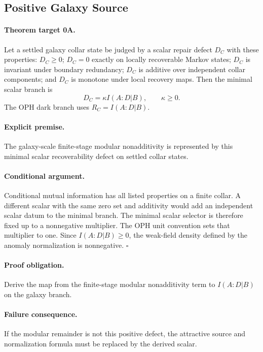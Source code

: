 \documentclass[11pt]{article}
\begin{document}
\subsection{Positive Galaxy Source}

\paragraph{Theorem target 0A.}
Let a settled galaxy collar state be judged by a scalar repair defect \(D_C\)
with these properties: \(D_C\ge0\); \(D_C=0\) exactly on locally recoverable
Markov states; \(D_C\) is invariant under boundary redundancy; \(D_C\) is
additive over independent collar components; and \(D_C\) is monotone under
local recovery maps.  Then the minimal scalar branch is
\begin{equation}
  D_C=\kappa I(A:D|B),
  \qquad
  \kappa\ge0.
\end{equation}
The OPH dark branch uses \(R_C=I(A:D|B)\).

\paragraph{Explicit premise.}
The galaxy-scale finite-stage modular nonadditivity is represented by this
minimal scalar recoverability defect on settled collar states.

\paragraph{Conditional argument.}
Conditional mutual information has all listed properties on a finite collar.
A different scalar with the same zero set and additivity would add an
independent scalar datum to the minimal branch.  The minimal scalar selector is
therefore fixed up to a nonnegative multiplier.  The OPH unit convention sets
that multiplier to one.  Since \(I(A:D|B)\ge0\), the weak-field density defined
by the anomaly normalization is nonnegative. \(\square\)

\paragraph{Proof obligation.}
Derive the map from the finite-stage modular nonadditivity term to
\(I(A:D|B)\) on the galaxy branch.

\paragraph{Failure consequence.}
If the modular remainder is not this positive defect, the attractive source and
normalization formula must be replaced by the derived scalar.
\end{document}
